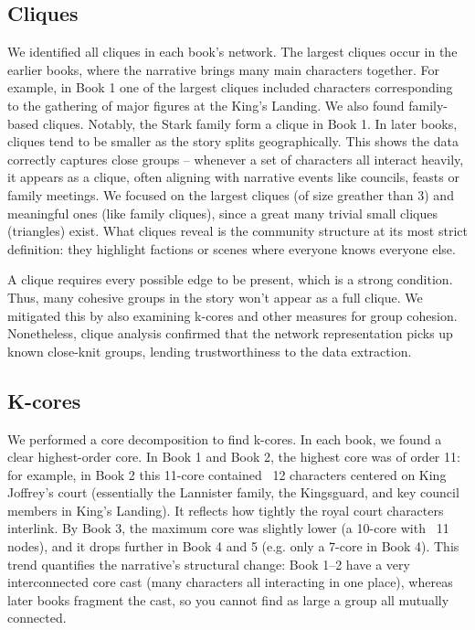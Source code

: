 \documentclass[12pt, a4paper]{article}
\begin{document}
\subsection*{Cliques}
We identified all cliques in each book's network. The largest cliques occur in the earlier books, where the narrative brings many main characters together. For example, in Book 1 one of the largest cliques included characters corresponding to the gathering of major figures at the King's Landing. We also found family-based cliques. Notably, the Stark family form a clique in Book 1. In later books, cliques tend to be smaller as the story splits geographically. This shows the data correctly captures close groups – whenever a set of characters all interact heavily, it appears as a clique, often aligning with narrative events like councils, feasts or family meetings. 
We focused on the largest cliques (of size greather than 3) and meaningful ones (like family cliques), since a great many trivial small cliques (triangles) exist. What cliques reveal is the community structure at its most strict definition: they highlight factions or scenes where everyone knows everyone else. 

A clique requires every possible edge to be present, which is a strong condition. Thus, many cohesive groups in the story won't appear as a full clique. We mitigated this by also examining k-cores and other measures for group cohesion. Nonetheless, clique analysis confirmed that the network representation picks up known close-knit groups, lending trustworthiness to the data extraction.

\subsection*{K-cores}

We performed a core decomposition to find k-cores. In each book, we found a clear highest-order core. In Book 1 and Book 2, the highest core was of order 11: for example, in Book 2 this 11-core contained ~12 characters centered on King Joffrey's court (essentially the Lannister family, the Kingsguard, and key council members in King's Landing). It reflects how tightly the royal court characters interlink. By Book 3, the maximum core was slightly lower (a 10-core with ~11 nodes), and it drops further in Book 4 and 5 (e.g. only a 7-core in Book 4). This trend quantifies the narrative's structural change: Book 1–2 have a very interconnected core cast (many characters all interacting in one place), whereas later books fragment the cast, so you cannot find as large a group all mutually connected. 
\end{document}
